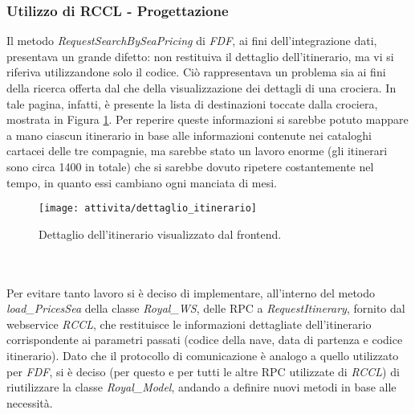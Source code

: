 \subsubsection{Utilizzo di RCCL - Progettazione}
Il metodo \textit{RequestSearchBySeaPricing} di \textit{FDF}, ai fini dell'integrazione dati, presentava un grande difetto: non restituiva il dettaglio dell'itinerario, ma vi si riferiva utilizzandone solo il codice. Ciò rappresentava un problema sia ai fini della ricerca offerta dal \bookingEngine\hphantom{i}che della visualizzazione dei dettagli di una crociera. In tale pagina, infatti, è presente la lista di destinazioni toccate dalla crociera, mostrata in Figura \ref{figura:destinazioni-crociera}. Per reperire queste informazioni si sarebbe potuto mappare a mano ciascun itinerario in base alle informazioni contenute nei cataloghi cartacei delle tre compagnie, ma sarebbe stato un lavoro enorme (gli itinerari sono circa 1400 in totale) che si sarebbe dovuto ripetere costantemente nel tempo, in quanto essi cambiano ogni manciata di mesi.\\
\begin{figure}[!h] 
	\centering 
	\texttt{[image: attivita/dettaglio\_itinerario]} 
	\caption{Dettaglio dell'itinerario visualizzato dal frontend.}
	\label{figura:destinazioni-crociera}
\end{figure}\\ \\Per evitare tanto lavoro si è deciso di implementare, all'interno del metodo \textit{load\_PricesSea} della classe \textit{Royal\_WS}, delle \gls{RPC} a \textit{RequestItinerary}, fornito dal \gls{webservice} \textit{RCCL}, che restituisce le informazioni dettagliate dell'itinerario corrispondente ai parametri passati (codice della nave, data di partenza e codice itinerario).  Dato che il protocollo di comunicazione è analogo a quello utilizzato per \textit{FDF}, si è deciso (per questo e per tutti le altre \gls{RPC} utilizzate di \textit{RCCL}) di riutilizzare la classe \textit{Royal\_Model}, andando a definire nuovi metodi in base alle necessità. 

